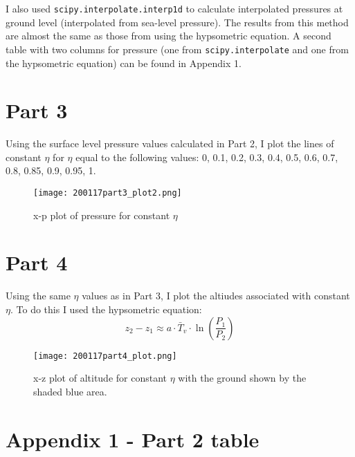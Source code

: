 \documentclass[12pt]{article}
\newcommand{\code}[1]{\texttt{#1}}
\begin{document}
I also used \code{scipy.interpolate.interp1d} to calculate interpolated pressures at ground level 
(interpolated from sea-level pressure). The results from this method are almost the same as those from using the hypsometric
equation. A second table with two columns for pressure (one from \code{scipy.interpolate} and one from the 
hypsometric equation) can be found in Appendix 1.


\section*{Part 3}

Using the surface level pressure values calculated in Part 2, I plot the lines of constant $ \eta $ 
for $ \eta $ equal to the following values: 0, 0.1, 0.2, 0.3, 0.4, 0.5, 0.6, 0.7, 0.8, 0.85, 0.9, 0.95, 1.


\begin{figure}[h]
    \centering
    \texttt{[image: 200117part3\_plot2.png]}
    \caption{x-p plot of pressure for constant $ \eta $}
    \label{fig:mesh1}
\end{figure}


\section*{Part 4}

Using the same $ \eta $ values as in Part 3, I plot the altiudes associated with constant $ \eta $.
To do this I used the hypsometric equation:
$$
z_{2}-z_{1} \approx a \cdot \bar{T}_{v} \cdot \ln \left(\frac{P_{1}}{P_{2}}\right)
$$


\begin{figure}[h]
    \centering
    \texttt{[image: 200117part4\_plot.png]}
    \caption{x-z plot of altitude for constant $ \eta $ with the ground shown by the shaded blue area.}
    \label{fig:mesh1}
\end{figure}


\newpage
\section*{Appendix 1 - Part 2 table}
\end{document}
